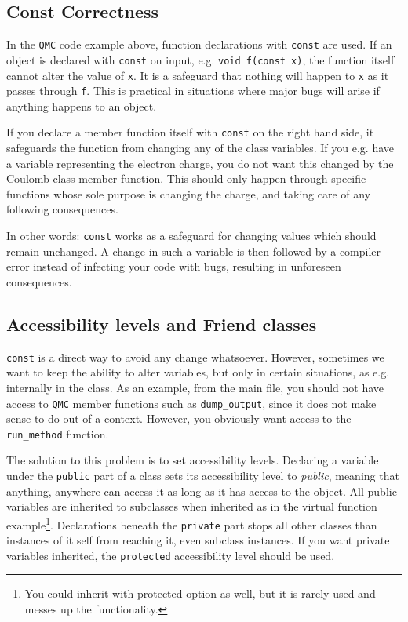 \subsection{Const Correctness}

In the \verb+QMC+ code example above, function declarations with \verb+const+ are used. If an object is declared with \verb+const+ on input, e.g. \verb+void f(const x)+, the function itself cannot alter the value of \verb+x+. It is a safeguard that nothing will happen to \verb+x+ as it passes through \verb+f+. This is practical in situations where major bugs will arise if anything happens to an object.

If you declare a member function itself with \verb+const+ on the right hand side, it safeguards the function from changing any of the class variables. If you e.g. have a variable representing the electron charge, you do not want this changed by the Coulomb class member function. This should only happen through specific functions whose sole purpose is changing the charge, and taking care of any following consequences. 

In other words: \verb+const+ works as a safeguard for changing values which should remain unchanged. A change in such a variable is then followed by a compiler error instead of infecting your code with bugs, resulting in unforeseen consequences.

\subsection{Accessibility levels and Friend classes}

\verb+const+ is a direct way to avoid any change whatsoever. However, sometimes we want to keep the ability to alter variables, but only in certain situations, as e.g. internally in the class. As an example, from the main file, you should not have access to \verb+QMC+ member functions such as \verb+dump_output+, since it does not make sense to do out of a context. However, you obviously want access to the \verb+run_method+ function.

The solution to this problem is to set accessibility levels. Declaring a variable under the \verb+public+ part of a class sets its accessibility level to \textit{public}, meaning that anything, anywhere can access it as long as it has access to the object. All public variables are inherited to subclasses when inherited as in the virtual function example\footnote{You could inherit with protected option as well, but it is rarely used and messes up the functionality.}. Declarations beneath the \verb+private+ part stops all other classes than instances of it self from reaching it, even subclass instances. If you want private variables inherited, the \verb+protected+ accessibility level should be used.

